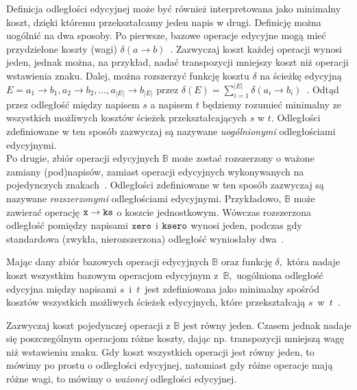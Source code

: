 \documentclass{praca1}
\begin{document}
Definicja odległości edycyjnej może być również interpretowana jako minimalny koszt, dzięki któremu przekształcamy jeden napis w drugi. Definicję można uogólnić na dwa sposoby. Po pierwsze, bazowe operacje edycyjne mogą mieć przydzielone koszty (wagi) $\delta(a \rightarrow b)$~\cite{Wagner1974:stringtostring}. Zazwyczaj koszt każdej operacji wynosi jeden, jednak można, na przykład, nadać transpozycji mniejszy koszt niż operacji wstawienia znaku. Dalej, można rozszerzyć funkcję kosztu $\delta$ na ścieżkę edycyjną $E = a_1 \rightarrow b_1, a_2 \rightarrow b_2, \ldots, a_{|E|} \rightarrow b_{|E|}$ przez $\delta(E) = \sum\limits_{i=1}^{|E|}\delta(a_i \rightarrow b_i)$~\cite{Boytsov2011:indexingmethods}. Odtąd przez odległość między napisem $s$ a napisem $t$ będziemy rozumieć minimalny ze wszystkich możliwych kosztów ścieżek przekształcających $s$ w $t$. Odległości zdefiniowane w ten sposób zazwyczaj są nazywane \emph{uogólnionymi} odległościami edycyjnymi.\\
Po drugie, zbiór operacji edycyjnych $\mathbb{B}$ może zostać rozszerzony o ważone zamiany (pod)napisów, zamiast operacji edycyjnych wykonywanych na pojedynczych znakach~\cite{Ukkonen1985:algorithmsforapprox}. Odległości zdefiniowane w ten sposób zazwyczaj są nazywane \emph{rozszerzonymi} odległościami edycyjnymi. Przykładowo, $\mathbb{B}$ może zawierać operację $\verb|x| \rightarrow \verb|ks|$ o koszcie jednostkowym. Wówczas rozszerzona odległość pomiędzy napisami $\verb|xero|$ i $\verb|ksero|$ wynosi jeden, podczas gdy standardowa (zwykła, nierozszerzona) odległość wyniosłaby dwa~\cite{Boytsov2011:indexingmethods}.

\begin{definition}\label{def:002}
Mając dany zbiór bazowych operacji edycyjnych $\mathbb{B}$ oraz funkcję $\delta$,~która nadaje koszt wszystkim bazowym operacjom edycyjnym z~$\mathbb{B}$,~uogólniona odległość edycyjna między napisami $s$~i~$t$~jest zdefiniowana jako minimalny spośród kosztów wszystkich możliwych ścieżek edycyjnych, które przekształcają $s$~w~$t$~\cite{Boytsov2011:indexingmethods}.
\end{definition}

Zazwyczaj koszt pojedynczej operacji z $\mathbb{B}$ jest równy jeden. Czasem jednak nadaje się poszczególnym operacjom różne koszty, dając np. transpozycji mniejszą wagę niż wstawieniu znaku. Gdy koszt wszystkich operacji jest równy jeden, to mówimy po prostu o odległości edycyjnej, natomiast gdy różne operacje mają różne wagi, to mówimy o \emph{ważonej} odległości edycyjnej.
\end{document}
